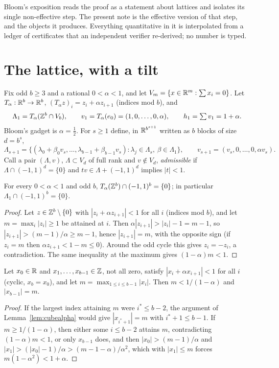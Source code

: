 \documentclass[11pt]{article}
\begin{document}
Bloom's exposition \cite{Bloom26} reads the proof as a statement about lattices and
isolates its single non-effective step. The present note is the effective version of that
step, and the objects it produces. Everything quantitative in it is interpolated from a
ledger of certificates that an independent verifier re-derived; no number is typed.

\section{The lattice, with a tilt}

Fix odd $b\ge3$ and a rational $0<\alpha<1$, and let $V_m=\{x\in\mathbb{R}^m:\sum x_i=0\}$. Let
$T_\alpha:\mathbb{R}^b\to\mathbb{R}^b$, $(T_\alpha z)_i=z_i+\alpha z_{i+1}$ (indices mod $b$), and
\[
\Lambda_1=T_\alpha(\mathbb{Z}^b\cap V_b),\qquad v_1=T_\alpha(e_0)=(1,0,\dots,0,\alpha),\qquad h_1=\textstyle\sum v_1=1+\alpha .
\]
Bloom's gadget is $\alpha=\tfrac12$. For $s\ge1$ define, in $\mathbb{R}^{b^{s+1}}$ written as $b$ blocks of size $d=b^s$,
\[
\Lambda_{s+1}=\{(\lambda_0+\beta_0v_s,\dots,\lambda_{b-1}+\beta_{b-1}v_s):\lambda_j\in\Lambda_s,\ \beta\in\Lambda_1\},
\qquad v_{s+1}=(v_s,0,\dots,0,\alpha v_s).
\]
Call a pair $(\Lambda,v)$, $\Lambda\subset V_d$ of full rank and $v\notin V_d$, \emph{admissible} if
$\Lambda\cap(-1,1)^d=\{0\}$ and $tv\in\Lambda+(-1,1)^d$ implies $|t|<1$.

\begin{lemma}\label{lem:cubealpha}
For every $0<\alpha<1$ and odd $b$, $T_\alpha(\mathbb{Z}^b)\cap(-1,1)^b=\{0\}$; in particular $\Lambda_1\cap(-1,1)^b=\{0\}$.
\end{lemma}
\begin{proof}
Let $z\in\mathbb{Z}^b\setminus\{0\}$ with $|z_i+\alpha z_{i+1}|<1$ for all $i$ (indices mod $b$), and let $m=\max_i|z_i|\ge1$ be attained at $i$. Then $\alpha|z_{i+1}|>|z_i|-1=m-1$, so $|z_{i+1}|>(m-1)/\alpha\ge m-1$, hence $|z_{i+1}|=m$, with the opposite sign (if $z_i=m$ then $\alpha z_{i+1}<1-m\le0$). Around the odd cycle this gives $z_i=-z_i$, a contradiction. The same inequality at the maximum gives $(1-\alpha)m<1$.
\end{proof}

\begin{lemma}\label{lem:stripalpha}
Let $x_0\in\mathbb{R}$ and $x_1,\dots,x_{b-1}\in\mathbb{Z}$, not all zero, satisfy $|x_i+\alpha x_{i+1}|<1$ for all $i$ (cyclic, $x_b=x_0$), and let $m=\max_{1\le i\le b-1}|x_i|$. Then $m<1/(1-\alpha)$ and $|x_{b-1}|=m$.
\end{lemma}
\begin{proof}
If the largest index attaining $m$ were $i^*\le b-2$, the argument of Lemma~\ref{lem:cubealpha} would give $|x_{i^*+1}|=m$ with $i^*+1\le b-1$. If $m\ge1/(1-\alpha)$, then either some $i\le b-2$ attains $m$, contradicting $(1-\alpha)m<1$, or only $x_{b-1}$ does, and then $|x_0|>(m-1)/\alpha$ and $|x_1|>(|x_0|-1)/\alpha>(m-1-\alpha)/\alpha^2$, which with $|x_1|\le m$ forces $m(1-\alpha^2)<1+\alpha$.
\end{proof}
\end{document}
